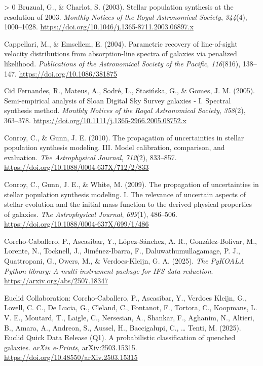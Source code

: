 \documentclass[10pt,a4paper,onecolumn]{article}
\newlength{\cslhangindent}
\newenvironment{CSLReferences}[3]%
{%
	\setlength{\parindent}{0pt}
	\ifodd #1 \everypar{\setlength{\hangindent}{\cslhangindent}}\ignorespaces\fi
	\ifnum #2 > 0
	\setlength{\parskip}{#2\baselineskip}
	\fi
}{}
\begin{document}
\begin{CSLReferences}{1}{0}
		\leavevmode\hypertarget{ref-bc+03}{}%
		Bruzual, G., \& Charlot, S. (2003). {Stellar population synthesis at the
			resolution of 2003}. \emph{Monthly Notices of the Royal Astronomical
			Society}, \emph{344}(4), 1000--1028.
		\url{https://doi.org/10.1046/j.1365-8711.2003.06897.x}
		
		\leavevmode\hypertarget{ref-capellari+04}{}%
		Cappellari, M., \& Emsellem, E. (2004). Parametric recovery of
		line-of-sight velocity distributions from absorption-line spectra of
		galaxies via penalized likelihood. \emph{Publications of the
			Astronomical Society of the Pacific}, \emph{116}(816), 138--147.
		\url{https://doi.org/10.1086/381875}
		
		\leavevmode\hypertarget{ref-cid-fernandes+05}{}%
		Cid Fernandes, R., Mateus, A., Sodr\'e, L., Stasi\'nska, G., \& Gomes, J. M.
		(2005). {Semi-empirical analysis of Sloan Digital Sky Survey galaxies -
			I. Spectral synthesis method}. \emph{Monthly Notices of the Royal
			Astronomical Society}, \emph{358}(2), 363--378.
		\url{https://doi.org/10.1111/j.1365-2966.2005.08752.x}
		
		\leavevmode\hypertarget{ref-conroyux5cux26gunn10}{}%
		Conroy, C., \& Gunn, J. E. (2010). The propagation of uncertainties in
		stellar population synthesis modeling. {III}. Model calibration,
		comparison, and evaluation. \emph{The Astrophysical Journal},
		\emph{712}(2), 833--857.
		\url{https://doi.org/10.1088/0004-637X/712/2/833}
		
		\leavevmode\hypertarget{ref-conroy+09}{}%
		Conroy, C., Gunn, J. E., \& White, M. (2009). The propagation of
		uncertainties in stellar population synthesis modeling. {I}. The
		relevance of uncertain aspects of stellar evolution and the initial mass
		function to the derived physical properties of galaxies. \emph{The
			Astrophysical Journal}, \emph{699}(1), 486--506.
		\url{https://doi.org/10.1088/0004-637X/699/1/486}
		
		\leavevmode\hypertarget{ref-pykoala_adass}{}%
		Corcho-Caballero, P., Ascasibar, Y., L\'opez-S\'anchez, A. R.,
		Gonz\'alez-Bol\'ivar, M., Lorente, N., Tocknell, J., Jim\'enez-Ibarra, F.,
		Daluwathumullagamage, P. J., Quattropani, G., Owers, M., \&
		Verdoes-Kleijn, G. A. (2025). \emph{The {PyKOALA} {Python} library: A
			multi-instrument package for {IFS} data reduction}.
		\url{https://arxiv.org/abs/2507.18347}
		
		\leavevmode\hypertarget{ref-cc+25}{}%
		Euclid Collaboration: Corcho-Caballero, P., Ascasibar, Y., Verdoes
		Kleijn, G., Lovell, C. C., De Lucia, G., Cleland, C., Fontanot, F.,
		Tortora, C., Koopmans, L. V. E., Moutard, T., Laigle, C., Nersesian, A.,
		Shankar, F., Aghanim, N., Altieri, B., Amara, A., Andreon, S., Aussel,
		H., Baccigalupi, C., \ldots{} Tenti, M. (2025). {Euclid Quick Data
			Release (Q1). A probabilistic classification of quenched galaxies}.
		\emph{arXiv e-Prints}, arXiv:2503.15315.
		\url{https://doi.org/10.48550/arXiv.2503.15315}
		

\end{CSLReferences}
\end{document}
